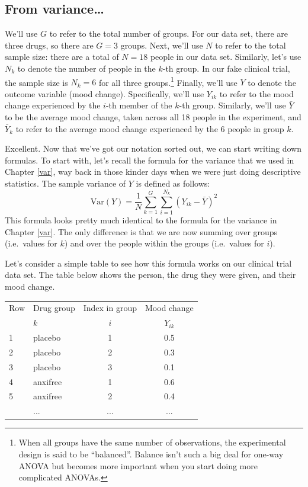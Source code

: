 \documentclass[
]{book}
\theoremstyle{definition}
\theoremstyle{definition}
\theoremstyle{definition}
\theoremstyle{definition}
\theoremstyle{remark}
\begin{document}
\hypertarget{from-variance}{%
\subsection{From variance\ldots{}}\label{from-variance}}

We'll use \(G\) to refer to the total number of groups. For our data set, there are three drugs, so there are \(G=3\) groups. Next, we'll use \(N\) to refer to the total sample size: there are a total of \(N=18\) people in our data set. Similarly, let's use \(N_k\) to denote the number of people in the \(k\)-th group. In our fake clinical trial, the sample size is \(N_k = 6\) for all three groups.\footnote{When all groups have the same number of observations, the experimental design is said to be ``balanced''. Balance isn't such a big deal for one-way ANOVA but becomes more important when you start doing more complicated ANOVAs.} Finally, we'll use \(Y\) to denote the outcome variable (mood change). Specifically, we'll use \(Y_{ik}\) to refer to the mood change experienced by the \(i\)-th member of the \(k\)-th group. Similarly, we'll use \(\bar{Y}\) to be the average mood change, taken across all 18 people in the experiment, and \(\bar{Y}_k\) to refer to the average mood change experienced by the 6 people in group \(k\).

Excellent. Now that we've got our notation sorted out, we can start writing down formulas. To start with, let's recall the formula for the variance that we used in Chapter \ref{var}, way back in those kinder days when we were just doing descriptive statistics. The sample variance of \(Y\) is defined as follows:
\[
\mbox{Var}(Y) = \frac{1}{N} \sum_{k=1}^G \sum_{i=1}^{N_k} \left(Y_{ik} - \bar{Y} \right)^2
\]
This formula looks pretty much identical to the formula for the variance in Chapter \ref{var}. The only difference is that we are now summing over groups (i.e.~values for \(k\)) and over the people within the groups (i.e.~values for \(i\)).

Let's consider a simple table to see how this formula works on our clinical trial data set. The table below shows the person, the drug they were given, and their mood change.

\begin{table}[!h]
\centering
\begin{tabular}{llcc}
\toprule
\multicolumn{1}{c}{Row} & \multicolumn{1}{c}{Drug group} & \multicolumn{1}{c}{Index in group} & \multicolumn{1}{c}{Mood change} \\
\cmidrule(l{3pt}r{3pt}){1-1} \cmidrule(l{3pt}r{3pt}){2-2} \cmidrule(l{3pt}r{3pt}){3-3} \cmidrule(l{3pt}r{3pt}){4-4}
  & $k$ & $i$ & $Y_{ik}$\\
\midrule
1 & placebo & 1 & 0.5\\
2 & placebo & 2 & 0.3\\
3 & placebo & 3 & 0.1\\
4 & anxifree & 1 & 0.6\\
5 & anxifree & 2 & 0.4\\
\addlinespace
6 & ... & ... & ...\\
\bottomrule
\end{tabular}
\end{table}
\end{document}
